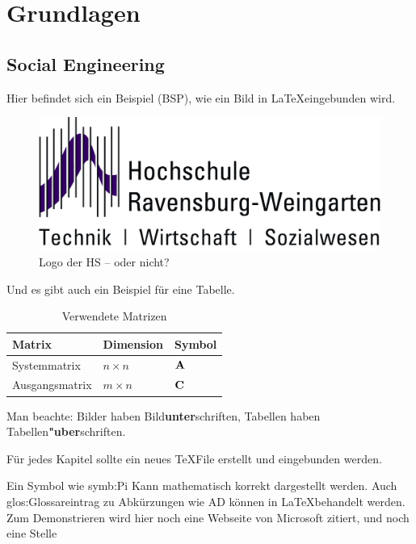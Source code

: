 
\chapter {Grundlagen}  %
\label{cha:grundlagen} %

\section{Social Engineering} %
\label {sec:Unterkapitel} %

Hier befindet sich ein Beispiel (\gls{BSP}), wie ein Bild in \LaTeX eingebunden wird.
\begin{figure}
 \begin{center}
  \includegraphics*{bilder/HSLogoWGd}
  \caption{Logo der HS -- oder nicht?}
  \label{fig:logo}
 \end{center}
\end{figure}

Und es gibt auch ein Beispiel für eine Tabelle.
\begin{table}
 \begin{center}
 \caption{Verwendete Matrizen}
 \label{matrizen}
  \begin{tabular}{|l|l|l|}
   \hline
   Matrix & Dimension & Symbol \\
   \hline
   Systemmatrix & $n \times n$ & ${\bf A}$  \\
   \hline
   Ausgangsmatrix & $m \times n$ & ${\bf C}$  \\
   \hline
  \end{tabular}
 \end{center}
\end{table}

Man beachte: Bilder haben Bild{\bf unter}schriften, 
Tabellen haben Tabellen{\bf "uber}schriften.

Für jedes Kapitel sollte ein neues \TeX  File erstellt und eingebunden werden. \newline

Ein Symbol wie \gls{symb:Pi} Kann mathematisch korrekt dargestellt werden. Auch \gls{glos:Glossareintrag} zu Abkürzungen wie \gls{AD} können in \LaTeX behandelt werden.
Zum Demonstrieren wird hier noch eine Webseite von Microsoft zitiert\cite{Mid09}, und noch eine Stelle\cite{Mid09b}


 
